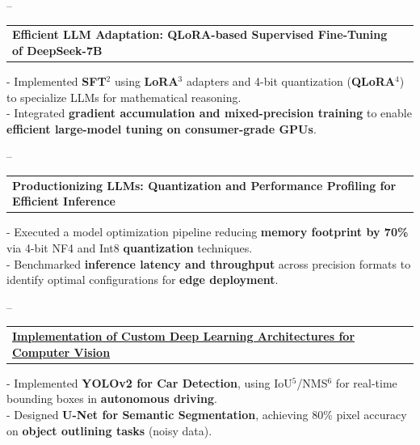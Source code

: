 \documentclass[10pt, a4paper]{article}
\makeatletter
\newcommand{\resumeProjectt}[4]{
\vspace{0.5mm}\item
    \begin{tabular*}{0.98\textwidth}[t]{l@{\extracolsep{\fill}}r}
        \textcolor{titleblue}{\textbf{#1}} & \footnotesize{#2}
    \end{tabular*}
    \vspace{-1.7mm}
}
\newcommand{\resumeItemListStart}{\begin{justify}\begin{itemize}[leftmargin=1ex, rightmargin=1ex, noitemsep,labelsep=1.2mm,itemsep=0mm]\small}
\newcommand{\resumeItemListEnd}{\end{itemize}\end{justify}\vspace{-2mm}}
\makeatother
\begin{document}
\vspace{-4mm}
\noindent\leaders\hbox{--}\hfill \null
\vspace{-2mm}
   \resumeProjectt
      {Efficient LLM Adaptation: QLoRA-based Supervised Fine-Tuning of DeepSeek-7B}
      {}
      \vspace{4mm}
\resumeItemListStart
\vspace{1mm}
{- Implemented \textbf{SFT}$^2$ using \textbf{LoRA}$^3$ adapters and 4-bit quantization (\textbf{QLoRA}$^4$) to specialize LLMs for mathematical reasoning.}\\
{- Integrated \textbf{gradient accumulation and mixed-precision training} to enable \textbf{efficient large-model tuning on consumer-grade GPUs}.} \\
\resumeItemListEnd

\vspace{-4mm}
\noindent\leaders\hbox{--}\hfill \null
\vspace{-2mm}
   \resumeProjectt
      {Productionizing LLMs: Quantization and Performance Profiling for Efficient Inference}
      {}
      \vspace{4mm}
\resumeItemListStart
\vspace{1mm}
{- Executed a model optimization pipeline reducing \textbf{memory footprint by 70\%} via 4-bit NF4 and Int8 \textbf{quantization} techniques.}\\
{- Benchmarked \textbf{inference latency and throughput} across precision formats to identify optimal configurations for \textbf{edge deployment}.} \\
\resumeItemListEnd

\vspace{-4mm}
\noindent\leaders\hbox{--}\hfill \null
\vspace{-2mm}
    \resumeProjectt
      {\href{https://github.com/senthilnathan01/my_ml_projects}{Implementation of Custom Deep Learning Architectures for Computer Vision}}
      {}
      \vspace{4mm}
\resumeItemListStart
\vspace{1mm}
{- Implemented \textbf{YOLOv2 for Car Detection}, using IoU$^5$/NMS$^6$ for real-time bounding boxes in \textbf{autonomous driving}.}\\
{- Designed \textbf{U-Net for Semantic Segmentation}, achieving 80\% pixel accuracy on \textbf{object outlining tasks} (noisy data).} \\
\resumeItemListEnd
\end{document}
